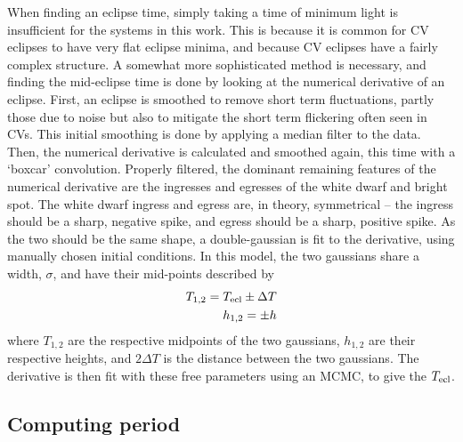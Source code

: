 When finding an eclipse time, simply taking a time of minimum light is insufficient for the systems in this work. This is because it is common for CV eclipses to have very flat eclipse minima, and because CV eclipses have a fairly complex structure.
A somewhat more sophisticated method is necessary, and finding the mid-eclipse time is done by looking at the numerical derivative of an eclipse.
First, an eclipse is smoothed to remove short term fluctuations, partly those due to noise but also to mitigate the short term flickering often seen in CVs. This initial smoothing is done by applying a median filter to the data. Then, the numerical derivative is calculated and smoothed again, this time with a `boxcar' convolution. Properly filtered, the dominant remaining features of the numerical derivative are the ingresses and egresses of the white dwarf and bright spot.
The white dwarf ingress and egress are, in theory, symmetrical -- the ingress should be a sharp, negative spike, and egress should be a sharp, positive spike. As the two should be the same shape, a double-gaussian is fit to the derivative, using manually chosen initial conditions. In this model, the two gaussians share a width, $\sigma$, and have their mid-points described by
\begin{align*}
    T_{\rm 1,2} = T_{\rm ecl} \pm \Delta T \\
    h_{\rm 1,2} = \pm h
\end{align*}
where $T_{1,2}$ are the respective midpoints of the two gaussians, $h_{1,2}$ are their respective heights, and $2\Delta T$ is the distance between the two gaussians.
The derivative is then fit with these free parameters using an MCMC, to give the $T_{\rm ecl}$.

\subsection{Computing period}
\label{sect:modelling:Computing ephemeris}

